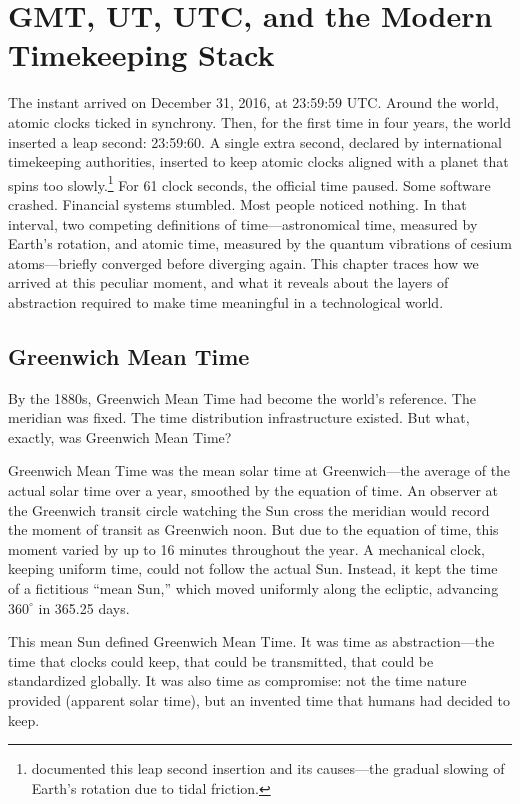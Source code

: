 \chapter{GMT, UT, UTC, and the Modern Timekeeping Stack}
\label{ch:utc-atomic-time}

The instant arrived on December 31, 2016, at 23:59:59 UTC. Around the world, atomic clocks ticked in synchrony. Then, for the first time in four years, the world inserted a leap second: 23:59:60. A single extra second, declared by international timekeeping authorities, inserted to keep atomic clocks aligned with a planet that spins too slowly.\footnote{\textcite{IERS2017} documented this leap second insertion and its causes—the gradual slowing of Earth's rotation due to tidal friction.} For 61 clock seconds, the official time paused. Some software crashed. Financial systems stumbled. Most people noticed nothing. In that interval, two competing definitions of time—astronomical time, measured by Earth's rotation, and atomic time, measured by the quantum vibrations of cesium atoms—briefly converged before diverging again. This chapter traces how we arrived at this peculiar moment, and what it reveals about the layers of abstraction required to make time meaningful in a technological world.

\section{Greenwich Mean Time}

By the 1880s, Greenwich Mean Time had become the world's reference. The meridian was fixed. The time distribution infrastructure existed. But what, exactly, was Greenwich Mean Time?

Greenwich Mean Time was the mean solar time at Greenwich—the average of the actual solar time over a year, smoothed by the equation of time. An observer at the Greenwich transit circle watching the Sun cross the meridian would record the moment of transit as Greenwich noon. But due to the equation of time, this moment varied by up to 16 minutes throughout the year. A mechanical clock, keeping uniform time, could not follow the actual Sun. Instead, it kept the time of a fictitious ``mean Sun,'' which moved uniformly along the ecliptic, advancing $360^{\circ}$ in 365.25 days.

This mean Sun defined Greenwich Mean Time. It was time as abstraction—the time that clocks could keep, that could be transmitted, that could be standardized globally. It was also time as compromise: not the time nature provided (apparent solar time), but an invented time that humans had decided to keep.

